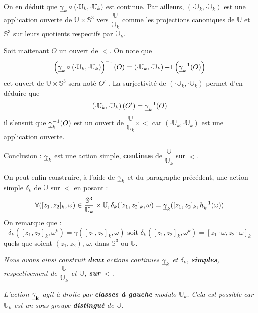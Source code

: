 On en d\'eduit que $\underline{\gamma}_{k}\circ \left(\cdot\mathbb{U}_k,\cdot\mathbb{U}_k\right)$ est continue. %
Par ailleurs, $\left(\cdot\mathbb{U}_k,\cdot\mathbb{U}_k\right)$ est une application ouverte de $\mathbb{U}\times\mathbb{S}^3$ vers $\dfrac{\mathbb{U}}{\mathbb{U}_k}$ %
comme les projections canoniques de $\mathbb{U}$ et $\mathbb{S}^3$ sur leurs quotients respectifs par $\mathbb{U}_k$.
\par
Soit maitenant $O$ un ouvert de $\lt$. On note que
\[\left(\gk\circ\left(\cdot\mathbb{U}_k,\cdot\mathbb{U}_k\right)\right)^{-1}(O)=%
\left(\cdot\mathbb{U}_k,\cdot\mathbb{U}_k\right){-1}\left(\gk^{-1}(O)\right)\]
cet ouvert de $\mathbb{U}\times\mathbb{S}^3$ sera not\'e $O'$ .%
La surjectivit\'e de $\left(\cdot\mathbb{U}_k,\cdot\mathbb{U}_k\right)$ permet d'en d\'eduire que
\[\left(\cdot\mathbb{U}_k,\cdot\mathbb{U}_k\right)(O')=\underline{\gamma}_{k}^{-1}(O)\]
il s'ensuit que $\underline{\gamma}_{k}^{-1}(O)$ est un ouvert de $\dfrac{\mathbb{U}}{\mathbb{U}_k}\times\lt$ car $\left(\cdot\mathbb{U}_k,\cdot\mathbb{U}_k\right)$ est une application ouverte.
\par
Conclusion : $\underline{\gamma}_{k}$ est une action simple, \textbf{continue} de $\dfrac{\mathbb{U}}{\mathbb{U}_k}$ sur $\lt$.
\par
On peut enfin construire, \`a l'aide de $\underline{\gamma}_{k}$ et du paragraphe pr\'ec\'edent, une action simple $\delta_k$ de $\mathbb{U}$ sur $\lt$ en posant :
\[\forall ([z_1,z_2]_k,\omega)\in\dfrac{\mathbb{S}^3}{\mathbb{U}_{k}}\times\mathbb{U},\delta_k([z_1,z_2]_k,\omega)=\underline{\gamma}_{k}([z_1,z_2]_k,h_k^{-1}(\omega))\]
On remarque que :
\[\delta_k\left([z_1,z_2]_k,\omega^k\right)=\gamma([z_1,z_2]_k,\omega)\text{ soit }\delta_k\left([z_1,z_2]_k,\omega^k\right)=[z_1\cdot\omega,z_2\cdot\omega]_k\]
quels que soient $(z_1,z_2)$, $\omega$, dans $\mathbb{S}^3$ ou $\mathbb{U}$.
\par
\emph{Nous avons ainsi construit \textbf{deux} actions continues $\underline{\gamma}_{k}$ et $\delta_k$, \textbf{simples}, respectivement de $\dfrac{\mathbb{U}}{\mathbb{U}_k}$ et $\mathbb{U}$, %
\textbf{sur} $\mathbf{\lt}$.}
\par
\emph{L'action $\mathbf{\underline{\gamma}_{k}}$ agit \`a droite par \textbf{classes \`a gauche} modulo $\mathbb{U}_k$. %
Cela est possible car $\mathbb{U}_k$ est un sous-groupe \textbf{distingu\'e} de $\mathbb{U}$.}

